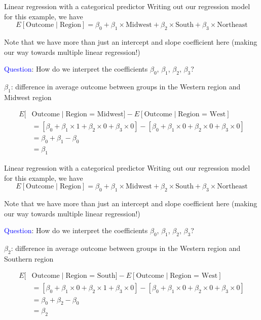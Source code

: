 \documentclass[10pt,t]{beamer}
\begin{document}
\begin{frame}{Linear regression with a categorical predictor}
Writing out our regression model for this example, we have
$$
E[\text{Outcome} \mid \text{Region}] = \beta_0 + \beta_1 \times \text{Midwest} + \beta_2 \times \text{South} + \beta_3 \times \text{Northeast}
$$

Note that we have more than just an intercept and slope coefficient here (making our way towards multiple linear regression!)

\vspace{0.3cm}

\textcolor{blue}{Question}: How do we interpret the coefficients $\beta_0$, $\beta_1$, $\beta_2$, $\beta_3$?

\vspace{0.3cm}

$\beta_1$: difference in average outcome between groups in the Western region and Midwest region

\begin{align*}
E[&\text{Outcome} \mid  \text{Region = Midwest}] - E[\text{Outcome} \mid \text{Region = West}] \\
& = [\beta_0 + \beta_1 \times 1 + \beta_2 \times 0 + \beta_3 \times 0] - [\beta_0 + \beta_1 \times 0 + \beta_2 \times 0 + \beta_3 \times 0] \\
& = \beta_0 + \beta_1 - \beta_0 \\
& = \beta_1
\end{align*}


\end{frame}

\begin{frame}{Linear regression with a categorical predictor}
Writing out our regression model for this example, we have
$$
E[\text{Outcome} \mid \text{Region}] = \beta_0 + \beta_1 \times \text{Midwest} + \beta_2 \times \text{South} + \beta_3 \times \text{Northeast}
$$

Note that we have more than just an intercept and slope coefficient here (making our way towards multiple linear regression!)

\vspace{0.3cm}

\textcolor{blue}{Question}: How do we interpret the coefficients $\beta_0$, $\beta_1$, $\beta_2$, $\beta_3$?

\vspace{0.3cm}

$\beta_2$: difference in average outcome between groups in the Western region and Southern region

\begin{align*}
E[&\text{Outcome} \mid  \text{Region = South}] - E[\text{Outcome} \mid \text{Region = West}] \\
& = [\beta_0 + \beta_1 \times 0 + \beta_2 \times 1 + \beta_3 \times 0] - [\beta_0 + \beta_1 \times 0 + \beta_2 \times 0 + \beta_3 \times 0] \\
& = \beta_0 + \beta_2 - \beta_0 \\
& = \beta_2
\end{align*}


\end{frame}
\end{document}
